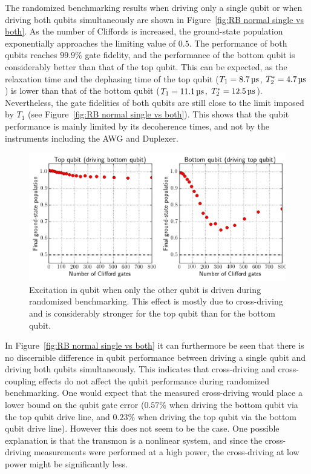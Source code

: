         The randomized benchmarking results when driving only a single qubit or when driving both qubits simultaneously are shown in Figure~\ref{fig:RB normal single vs both}. As the number of Cliffords is increased, the ground-state population exponentially approaches the limiting value of $0.5$. The performance of both qubits reaches $99.9\%$ gate fidelity, and the performance of the bottom qubit is considerably better than that of the top qubit.  This can be expected, as the relaxation time and the dephasing time of the top qubit ($T_1 = \text{\ensuremath{\SI{8.7}{\micro \second}}}$, $T_2^*=\text{\ensuremath{\SI{4.7}{\micro \second}}}$) is lower than that of the bottom qubit ($T_1 = \text{\ensuremath{\SI{11.1}{\micro \second}}}$, $T_2^*=\text{\ensuremath{\SI{12.5}{\micro \second}}}$). Nevertheless, the gate fidelities of both qubits are still close to the limit imposed by $T_1$ (see Figure~\ref{fig:RB normal single vs both}). This shows that the qubit performance is mainly limited by its decoherence times, and not by the instruments including the AWG and Duplexer.

        \begin{figure}[tb]
          \centering
          \includegraphics[width=\textwidth]{../Figures/Randomized benchmarking/RB_normal_cross-driving.png}
          \caption{Excitation in qubit when only the other qubit is driven during randomized benchmarking. This effect is mostly due to cross-driving and is considerably stronger for the top qubit than for the bottom qubit.}
          \label{fig:RB normal cross-driving}
        \end{figure}

        In Figure~\ref{fig:RB normal single vs both} it can furthermore be seen that there is no discernible difference in qubit performance between driving a single qubit and driving both qubits simultaneously. This indicates that cross-driving and cross-coupling effects do not affect the qubit performance during randomized benchmarking. One would expect that the measured cross-driving would place a lower bound on the qubit gate error ($0.57\%$ when driving the bottom qubit via the top qubit drive line, and $0.23\%$ when driving the top qubit via the bottom qubit drive line). However this does not seem to be the case. One possible explanation is that the transmon is a nonlinear system, and since the cross-driving measurements were performed at a high power, the cross-driving at low power might be significantly less.

